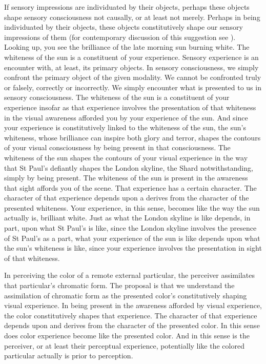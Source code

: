 If sensory impressions are individuated by their objects, perhaps these objects shape sensory consciousness not causally, or at least not merely. Perhaps in being individuated by their objects, these objects constitutively shape our sensory impressions of them (for contemporary discussion of this suggestion see \citealt{McDowell:1998vn,Martin:2004fj,Fish:2009fk,Kalderon:2011fk}). Looking up, you see the brilliance of the late morning sun burning white. The whiteness of the sun is a constituent of your experience. Sensory experience is an encounter with, at least, its primary objects. In sensory consciousness, we simply confront the primary object of the given modality. We cannot be confronted truly or falsely, correctly or incorrectly. We simply encounter what is presented to us in sensory consciousness. The whiteness of the sun is a constituent of your experience insofar as that experience involves the presentation of that whiteness in the visual awareness afforded you by your experience of the sun. And since your experience is constitutively linked to the whiteness of the sun, the sun's whiteness, whose brilliance can inspire both glory and terror, shapes the contours of your visual consciousness by being present in that consciousness. The whiteness of the sun shapes the contours of your visual experience in the way that St Paul's defiantly shapes the London skyline, the Shard notwithstanding, simply by being present. The whiteness of the sun is present in the awareness that sight affords you of the scene. That experience has a certain character. The character of that experience depends upon a derives from the character of the presented whiteness. Your experience, in this sense, becomes like the way the sun actually is, brilliant white. Just as what the London skyline is like depends, in part, upon what St Paul's is like, since the London skyline involves the presence of St Paul's as a part, what your experience of the sun is like depends upon what the sun's whiteness is like, since your experience involves the presentation in sight of that whiteness.

In perceiving the color of a remote external particular, the perceiver assimilates that particular's chromatic form. The proposal is that we understand the assimilation of chromatic form as the presented color's constitutively shaping visual experience. In being present in the awareness afforded by visual experience, the color constitutively shapes that experience. The character of that experience depends upon and derives from the character of the presented color. In this sense does color experience become like the presented color. And in this sense is the perceiver, or at least their perceptual experience, potentially like the colored particular actually is prior to perception.

